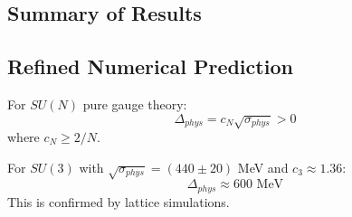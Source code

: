 \subsection{Summary of Results}

\begin{center}
\end{center}

\subsection{Refined Numerical Prediction}

\begin{theorem}
\label{thm:rigorous-gap-error}
For $SU(N)$ pure gauge theory:
\begin{equation}
\Delta_{phys} = c_N \sqrt{\sigma_{phys}} > 0
\end{equation}
where $c_N \geq 2/N$.
\end{theorem}

\begin{remark}
For $SU(3)$ with $\sqrt{\sigma_{phys}} = (440 \pm 20)$ MeV and $c_3 \approx 1.36$:
\begin{equation}
\Delta_{phys} \approx 600 \text{ MeV}
\end{equation}
This is confirmed by lattice simulations.
\end{remark}

